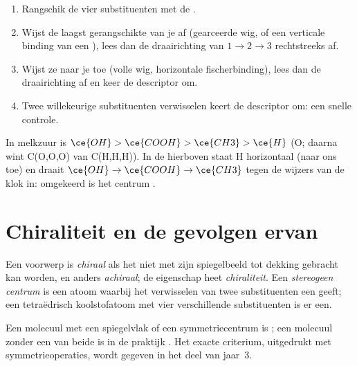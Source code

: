 \begin{method}\label{met:b1:stereochemistry-in-depth:cip}
\begin{enumerate}
  \item Rangschik de vier substituenten met de .
  \item Wijst de laagst gerangschikte van je af (gearceerde wig, of een
        verticale binding van een ), lees dan de draairichting
        van $1 \to 2 \to 3$ rechtstreeks af.
  \item Wijst ze naar je toe (volle wig, horizontale fischerbinding),
        lees dan de draairichting af en keer de descriptor om.
  \item Twee willekeurige substituenten verwisselen keert de descriptor
        om: een snelle controle.
\end{enumerate}
In melkzuur is $\ce{OH} > \ce{COOH} > \ce{CH3} > \ce{H}$ (O; daarna wint
C(O,O,O) van C(H,H,H)). In de  hierboven staat H
horizontaal (naar ons toe) en draait $\ce{OH} \to \ce{COOH} \to \ce{CH3}$
tegen de wijzers van de klok in: omgekeerd is het centrum .
\end{method}

\section{Chiraliteit en de gevolgen ervan}

\begin{definition}\label{def:b1:stereochemistry-in-depth:stereocentre}
Een voorwerp is \emph{chiraal} als het niet met zijn
spiegelbeeld tot dekking gebracht kan worden, en anders
\emph{achiraal}; de eigenschap heet
\emph{chiraliteit}. Een \emph{stereogeen
centrum} is een atoom waarbij het verwisselen
van twee substituenten een  geeft; een tetraëdrisch
koolstofatoom met vier verschillende substituenten is er een.
\end{definition}

Een molecuul met een spiegelvlak of een symmetriecentrum is ; een
molecuul zonder een van beide is in de praktijk . Het exacte
criterium, uitgedrukt met symmetrieoperaties, wordt gegeven in het deel
van jaar~3.

